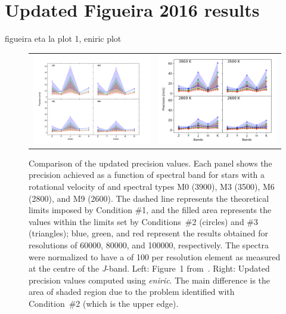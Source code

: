 

\section{ Updated Figueira 2016 results}
 figueira eta la plot 1, eniric plot

\begin{figure}
    \centering
    \begin{tabular}{cc}
        \includegraphics[width=0.48\linewidth]{figures/information-content/Rvprec_vsini1.pdf} &  %
        \includegraphics[width=0.47\linewidth]{figures/information-content/precision_fourpanel.png}\\ %
    \end{tabular}
    \caption[Comparision of {RV} precision results to~\citet{figueira_radial_2016}.]{Comparison of the updated precision values.
        Each panel shows the precision achieved as a function of spectral band for stars with a rotational velocity of \kmps{} and spectral types M0 (3900\K), M3 (3500\K), M6 (2800\K), and M9 (2600\K).
        The dashed line represents the theoretical limits imposed by Condition \#1, and the filled area represents the values within the limits set by Conditions~\#2 (circles) and \#3 (triangles); blue, green, and red represent the results obtained for resolutions of 60000, 80000, and 100000, respectively.
        The spectra were normalized to have a \snr{} of 100 per resolution element as measured at the centre of the \emph{J}-band.
        Left: Figure~1 from~\citet{figueira_radial_2016}.
        Right: Updated precision values computed using \emph{eniric}.
        The main difference is the area of shaded region due to the problem identified with Condition~\#2 (which is the upper edge).}
    \label{fig:figueria_comparision}
\end{figure}


